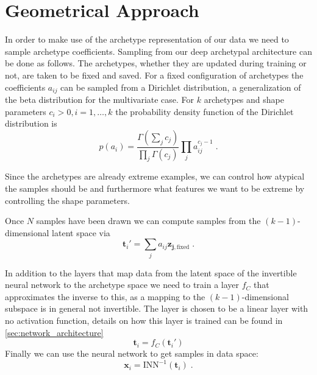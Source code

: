 \section{Geometrical Approach}%
\label{sec:geometrical_approach}

In order to make use of the archetype representation of our data we need to
sample archetype coefficients. Sampling from our deep archetypal architecture
can be done as follows. The archetypes, whether they are updated during training
or not, are taken to be fixed and saved. For a fixed configuration of
archetypes the coefficients $a_{ij}$ can be sampled from a Dirichlet distribution,
a generalization of the beta distribution for the multivariate case. For $k$
archetypes and shape parameters $c_i > 0, i = 1, \dots, k$ the probability
density function of the Dirichlet distribution is
\begin{equation}%
	\label{eq:dirichlet_pdf}
	p(a_i) = \frac{ \Gamma ( \sum_j c_j ) }{ \prod_j \Gamma (c_j) } \prod_j
	a_{ij}^{c_j - 1}\;.
\end{equation}
\citep{forbesDirichletDistribution2010}

Since the archetypes are already extreme examples, we can control how atypical
the samples should be and furthermore what features we want to be extreme by
controlling the shape parameters.

Once $N$ samples have been drawn we can compute samples from the
$(k-1)$-dimensional latent space via
\begin{equation}%
	\label{eq:aa_k_sample}
	\mathbf{t}_i' = \sum_j a_{ij} \mathbf{z_{j,\mathrm{fixed}}}\;.
\end{equation}

In addition to the layers that map data from the latent space of the invertible
neural network to the archetype space we need to train a layer $f_C$ that
approximates the inverse to this, as a mapping to the $(k-1)$-dimensional
subspace is in general not invertible. The layer is chosen to be a linear layer
with no activation function, details on how this layer is trained can
be found in \autoref{sec:network_architecture}
\begin{equation}%
	\label{eq:aa_upsample}
	\mathbf{t}_i = f_C (\mathbf{t}_i')
\end{equation}
Finally we can use the neural network to get samples in data space:
\begin{equation}%
	\label{eq:aa_to_data}
	\mathbf{x}_i = \mathrm{INN}^{-1} (\mathbf{t}_i)\;.
\end{equation}


